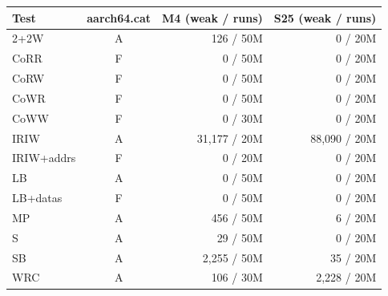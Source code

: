 \begin{tabular}{lcrr}
\toprule
Test & aarch64.cat & M4 (weak / runs) & S25 (weak / runs) \\
\midrule
2+2W & A & 126 / 50M & 0 / 20M \\
CoRR & F & 0 / 50M & 0 / 20M \\
CoRW & F & 0 / 50M & 0 / 20M \\
CoWR & F & 0 / 50M & 0 / 20M \\
CoWW & F & 0 / 30M & 0 / 20M \\
IRIW & A & 31,177 / 20M & 88,090 / 20M \\
IRIW+addrs & F & 0 / 20M & 0 / 20M \\
LB & A & 0 / 50M & 0 / 20M \\
LB+datas & F & 0 / 50M & 0 / 20M \\
MP & A & 456 / 50M & 6 / 20M \\
S & A & 29 / 50M & 0 / 20M \\
SB & A & 2,255 / 50M & 35 / 20M \\
WRC & A & 106 / 30M & 2,228 / 20M \\
\bottomrule
\end{tabular}
